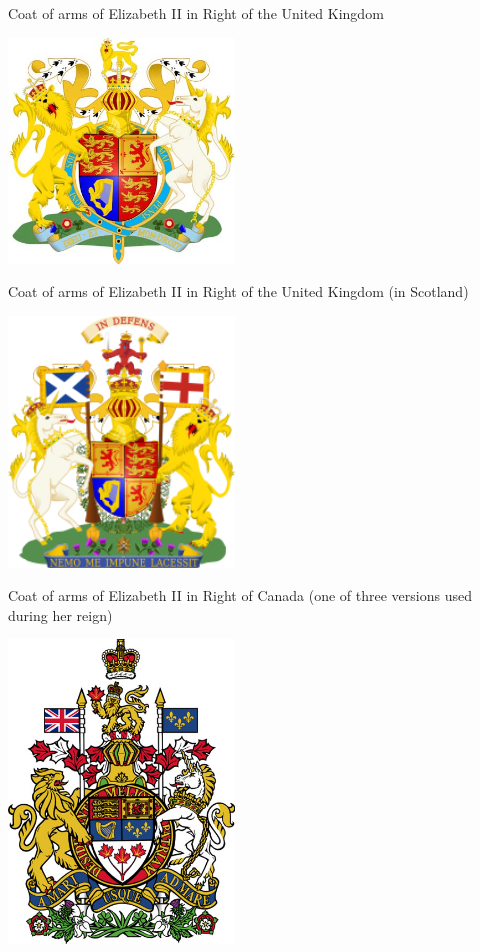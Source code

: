 \documentclass[11pt;a4paper]{article}
\begin{document}
\begin{center}
 Coat of arms of Elizabeth II in Right of the United Kingdom
 
 \includegraphics[width=6cm]{images/royal}

 Coat of arms of Elizabeth II in Right of the United Kingdom (in Scotland)

 \includegraphics[width=6cm]{images/scot}

 Coat of arms of Elizabeth II in Right of Canada (one of three versions used during her reign)

 \includegraphics[width=6cm]{images/can}
\end{center}
\end{document}
